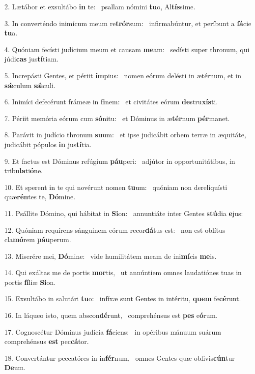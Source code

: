 2. Lætábor et exsultábo \textbf{in} te: \ast\  psallam nómini \textbf{tu}o, Al\textbf{tís}sime.\

3. In converténdo inimícum meum re\textbf{trór}sum: \ast\  infirmabúntur, et períbunt a \textbf{fá}cie \textbf{tu}a.\

4. Quóniam fecísti judícium meum et causam \textbf{me}am: \ast\  sedísti super thronum, qui júdi\textbf{cas} jus\textbf{tí}tiam.\

5. Increpásti Gentes, et périit \textbf{ím}pius: \ast\  nomen eórum delésti in ætérnum, et in \textbf{sǽ}culum \textbf{sǽ}culi.\

6. Inimíci defecérunt frámeæ in \textbf{fi}nem: \ast\  et civitátes eórum \textbf{de}stru\textbf{xís}ti.\

7. Périit memória eórum cum \textbf{só}nitu: \ast\  et Dóminus in æ\textbf{tér}num \textbf{pér}manet.\

8. Parávit in judício thronum \textbf{su}um: \ast\  et ipse judicábit orbem terræ in æquitáte, judicábit pópulos \textbf{in} jus\textbf{tí}tia.\

9. Et factus est Dóminus refúgium \textbf{páu}peri: \ast\  adjútor in opportunitátibus, in tribu\textbf{la}ti\textbf{ó}ne.\

10. Et sperent in te qui novérunt nomen \textbf{tu}um: \ast\  quóniam non dereliquísti quæ\textbf{rén}tes te, \textbf{Dó}mine.\

11. Psállite Dómino, qui hábitat in \textbf{Si}on: \ast\  annuntiáte inter Gentes \textbf{stú}dia \textbf{e}jus:\

12. Quóniam requírens sánguinem eórum recor\textbf{dá}tus est: \ast\  non est oblítus cla\textbf{mó}rem \textbf{páu}perum.\

13. Miserére mei, \textbf{Dó}mine: \ast\  vide humilitátem meam de ini\textbf{mí}cis \textbf{me}is.\

14. Qui exáltas me de portis \textbf{mor}tis, \ast\  ut annúntiem omnes laudatiónes tuas in portis \textbf{fí}liæ \textbf{Si}on.\

15. Exsultábo in salutári \textbf{tu}o: \ast\  infíxæ sunt Gentes in intéritu, \textbf{quem} fe\textbf{cé}runt.\

16. In láqueo isto, quem abscon\textbf{dé}runt, \ast\  comprehénsus est \textbf{pes} e\textbf{ó}rum.\

17. Cognoscétur Dóminus judícia \textbf{fá}ciens: \ast\  in opéribus mánuum suárum comprehénsus \textbf{est} pec\textbf{cá}tor.\

18. Convertántur peccatóres in in\textbf{fér}num, \ast\  omnes Gentes quæ oblivis\textbf{cún}tur \textbf{De}um.\

